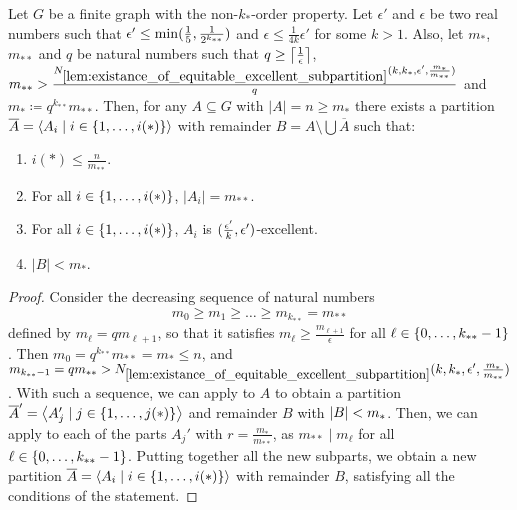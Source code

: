     \begin{lemma}[Claim 5.14.1a] \label{lem:existance_of_excellent_partition_with_equal_size}
        Let $G$ be a finite graph with the non-$k_{*}$-order property.
        Let $\epsilon'$ and $\epsilon$ be two real numbers such that
        $\epsilon' \leq \min ( \frac{1}{5}, \frac{1}{2^{k_{**}}} )$ and $\epsilon \leq \frac{1}{4k} \epsilon'$ for some $k > 1$.
        Also, let $m_*$, $m_{**}$ and $q$ be natural numbers such that $q \geq \left\lceil \frac{1}{\epsilon} \right\rceil$,
        $m_{**} > \frac{N_{\ref{lem:existance_of_equitable_excellent_subpartition}}
            ( k, k_*, \epsilon', \frac{m_*}{m_{**}} )}{q}$ and $m_* \coloneqq q^{k_{**}} m_{**}$.
        Then, for any $A \subseteq G$ with $|A| = n \geq m_*$ there exists a partition
        $\overline{A} = \left< A_i \mid i \in \{ 1, \dots, i(*) \} \right>$ with remainder $B = A \setminus \bigcup \overline{A}$ such that:
        \begin{enumerate}[label=(\alph*), ref=\alph*]
            \item \label{itm:existance_of_excellent_partition_with_equal_size.a} $i(*) \leq \frac{n}{m_{**}}$.
            \item \label{itm:existance_of_excellent_partition_with_equal_size.b} For all
                $i \in \{ 1, \dots, i(*) \}$, $|A_i| = m_{**}$.
            \item \label{itm:existance_of_excellent_partition_with_equal_size.c} For all
                $i \in \{ 1, \dots, i(*) \}$, $A_i$ is $( \frac{\epsilon'}{k}, \epsilon' )$-excellent.
            \item \label{itm:existance_of_excellent_partition_with_equal_size.d} $|B| < m_*$.
        \end{enumerate}
        \begin{proof}
            Consider the decreasing sequence of natural numbers
            \[
                m_0 \geq m_1 \geq \dots \geq m_{k_{**}} = m_{**}
            \]
            defined by $m_\ell = q m_{\ell+1}$, so that it satisfies $m_\ell \geq \frac{m_{\ell+1}}{\epsilon}$ for all
            $\ell \in \{ 0, \dots, k_{**} - 1 \}$.
            Then $m_0 = q^{k_{**}} m_{**} = m_* \leq n$, and $m_{k_{**}-1} = q m_{**} >
                N_{\ref{lem:existance_of_equitable_excellent_subpartition}}( k, k_*, \epsilon', \frac{m_*}{m_{**}} )$.
            With such a sequence, we can apply  to $A$ to obtain a partition
            $\overline{A}' = \left< A_j' \mid j \in \{ 1, \dots, j(*) \} \right>$ and remainder $B$ with $| B | < m_*$.
            Then, we can apply  to each of the parts $A_j'$
            with $r = \frac{m_*}{m_{**}}$, as $m_{**} \mid m_\ell$ for all $\ell \in \{ 0, \dots, k_{**} - 1 \}$.
            Putting together all the new subparts, we obtain a new partition
            $\overline{A} = \left< A_i \mid i \in \{ 1, \dots, i(*) \} \right>$
            with remainder $B$, satisfying all the conditions of the statement.
        \end{proof}
    \end{lemma}

